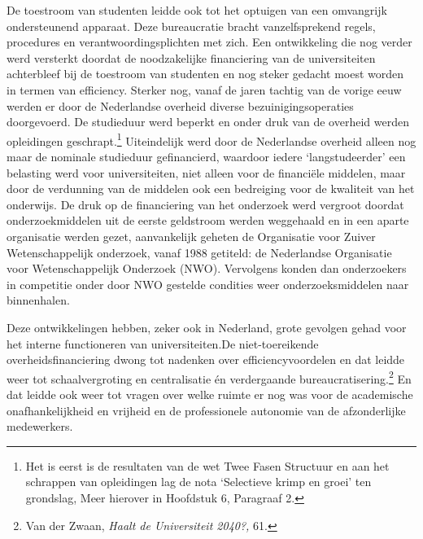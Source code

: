 \documentclass[smallauthor, chapterhaspagenum, nochapterinheader, pagenuminheader,  bigchapnum,medium2, tocpages,  garamond, titleinheader]{jote-book}
\begin{document}
	De toestroom van studenten leidde ook tot het optuigen van een omvangrijk ondersteunend apparaat. Deze bureaucratie bracht vanzelfsprekend regels, procedures en verantwoordingsplichten met zich. Een ontwikkeling die nog verder werd versterkt doordat de noodzakelijke financiering van de universiteiten achterbleef bij de toestroom van studenten en nog steker gedacht moest worden in termen van efficiency. Sterker nog, vanaf de jaren tachtig van de vorige eeuw werden er door de Nederlandse overheid diverse bezuinigingsoperaties doorgevoerd. De studieduur werd beperkt en onder druk van de overheid werden opleidingen geschrapt.\footnote{Het is eerst is de resultaten van de wet Twee Fasen Structuur en aan het schrappen van opleidingen lag de nota ‘Selectieve krimp en groei' ten grondslag, Meer hierover in Hoofdstuk 6, Paragraaf 2.} Uiteindelijk werd door de Nederlandse overheid alleen nog maar de nominale studieduur gefinancierd, waardoor iedere ‘langstudeerder' een belasting werd voor universiteiten, niet alleen voor de financiële middelen, maar door de verdunning van de middelen ook een bedreiging voor de kwaliteit van het onderwijs. De druk op de financiering van het onderzoek werd vergroot doordat onderzoekmiddelen uit de eerste geldstroom werden weggehaald en in een aparte organisatie werden gezet, aanvankelijk geheten de Organisatie voor Zuiver Wetenschappelijk onderzoek, vanaf 1988 getiteld: de Nederlandse Organisatie voor Wetenschappelijk Onderzoek (NWO). Vervolgens konden dan onderzoekers in competitie onder door NWO gestelde condities weer onderzoeksmiddelen naar binnenhalen.



	Deze ontwikkelingen hebben, zeker ook in Nederland, grote gevolgen gehad voor het interne functioneren van universiteiten.\fbox{ }De niet-toereikende overheidsfinanciering dwong tot nadenken over efficiencyvoordelen en dat leidde weer tot schaalvergroting en centralisatie én verdergaande bureaucratisering.\footnote{Van der Zwaan, \emph{Haalt de Universiteit 2040?,} 61. } En dat leidde ook weer tot vragen over welke ruimte er nog was voor de academische onafhankelijkheid en vrijheid en de professionele autonomie van de afzonderlijke medewerkers.
\end{document}
